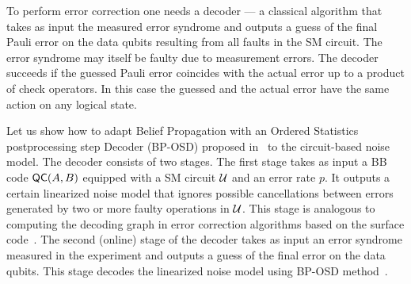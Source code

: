 \documentclass{article}
\begin{document}
To perform error correction one needs a decoder — a classical algorithm that takes as input
the measured  error syndrome and outputs a guess of the final Pauli error on the data qubits resulting from all
faults in the SM circuit. The error syndrome may itself be faulty
due to measurement errors. The decoder succeeds if the guessed Pauli error 
coincides with the actual error up to  a product of check operators.
In this case the guessed and the actual error have the same action on any logical state.


Let us show how to adapt Belief Propagation with an Ordered Statistics 
postprocessing step
Decoder (BP-OSD) proposed in~\cite{panteleev2021degenerate,roffe2020decoding}
to the circuit-based noise model.
The decoder consists of two stages.
The first stage takes as input a BB
code $\mathsf{QC}(A,B)$ equipped with a SM circuit ${\cal U }$  and an error rate $p$. 
It outputs a certain linearized noise model 
that ignores possible cancellations between errors generated by two or more faulty
operations in ${\cal U }$.  This stage is analogous to computing
the decoding graph in error correction algorithms based on the surface code~\cite{fowler2012topological,higgott2023sparse}.
The second (online) stage of the decoder
 takes as input an
error syndrome measured in the experiment
and outputs a guess of the final error on the data qubits. 
This stage
 decodes the linearized noise model
using BP-OSD method~\cite{panteleev2021degenerate,roffe2020decoding}.
\end{document}
